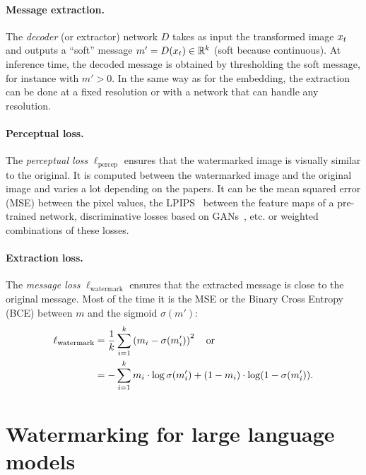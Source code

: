 \paragraph*{Message extraction.}
The \emph{decoder} (or extractor) network $D$ takes as input the transformed image $x_t$ and outputs a ``soft'' message $m' = D(x_t) \in \mathbb{R}^k$ (soft because continuous).
At inference time, the decoded message is obtained by thresholding the soft message, for instance with $m' > 0$.
In the same way as for the embedding, the extraction can be done at a fixed resolution or with a network that can handle any resolution.

\paragraph*{Perceptual loss.}
The \emph{perceptual loss} $\ell_{\text{percep}}$ ensures that the watermarked image is visually similar to the original.
It is computed between the watermarked image and the original image and varies a lot depending on the papers.
It can be the mean squared error (MSE) between the pixel values, the LPIPS~\citep{zhang2018unreasonable} between the feature maps of a pre-trained network, discriminative losses based on GANs~\citep{goodfellow2014generative}, etc. or weighted combinations of these losses.

\paragraph*{Extraction loss.}
The \emph{message loss} $\ell_{\text{watermark}}$ ensures that the extracted message is close to the original message.
Most of the time it is the MSE or the Binary Cross Entropy (BCE) between $m$ and the sigmoid $\sigma (m')$:
\begin{align}
    \ell_{\text{watermark}} &= \frac{1}{k} \sum_{i=1}^k \left( m_i - \sigma (m'_i) \right)^2 
    \quad \text{or} \nonumber\\
    & =- \sum_{i=1}^k m_i \cdot \log \sigma (m'_i) + (1-m_i) \cdot \log ( 1 - \sigma (m'_i)).
\end{align}










\section{Watermarking for large language models}\label{chap0/sec:llm_wm}


